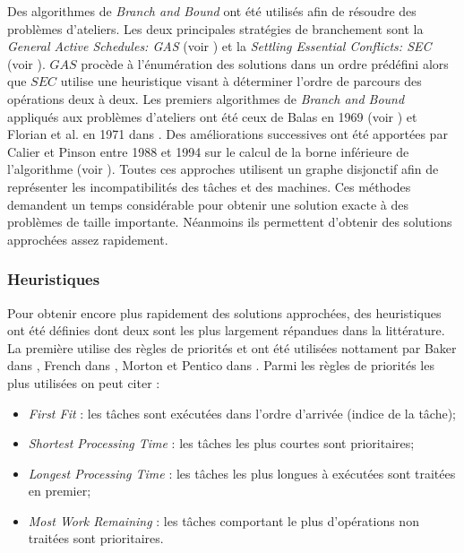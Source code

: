 Des algorithmes de \textit{Branch and Bound} ont été utilisés afin de résoudre des problèmes d'ateliers. Les deux principales stratégies de branchement sont la \textit{General Active Schedules: GAS} (voir \cite{Lageweg1977}) et la \textit{Settling Essential Conflicts: SEC} (voir \cite{Barker1985}). $GAS$ procède à l'énumération des solutions dans un ordre prédéfini alors que $SEC$ utilise une heuristique visant à déterminer l'ordre de parcours des opérations deux à deux. Les premiers algorithmes de \textit{Branch and Bound} appliqués aux problèmes d'ateliers ont été ceux de Balas en 1969 (voir \cite{Balas1969}) et Florian et al. en 1971 dans \cite{Florian1971}. Des améliorations successives ont été apportées par Calier et Pinson entre 1988 et 1994 sur le calcul de la borne inférieure de l'algorithme (voir \cite{Pinson1988,Carlier1989,Carlier1990,Carlier1994}). Toutes ces approches utilisent un graphe disjonctif afin de représenter les incompatibilités des tâches et des machines. Ces méthodes demandent un 
temps considérable pour obtenir une solution exacte à des problèmes de taille importante. Néanmoins ils permettent d'obtenir des solutions approchées assez rapidement.

\subsubsection{Heuristiques}

Pour obtenir encore plus rapidement des solutions approchées, des heuristiques ont été définies dont deux sont les plus largement répandues dans la littérature. \\

La première utilise des règles de priorités et ont été utilisées nottament par Baker dans \cite{Baker1974}, French dans \cite{French1982}, Morton et Pentico dans \cite{Morton1993}. Parmi les règles de priorités les plus utilisées on peut citer : 
\begin{itemize}
 \item \textit{First Fit} : les tâches sont exécutées dans l'ordre d'arrivée (indice de la tâche);
 \item \textit{Shortest Processing Time} : les tâches les plus courtes sont prioritaires;
 \item \textit{Longest Processing Time} : les tâches les plus longues à exécutées sont traitées en premier;
 \item \textit{Most Work Remaining} : les tâches comportant le plus d'opérations non traitées sont prioritaires.
\end{itemize}

